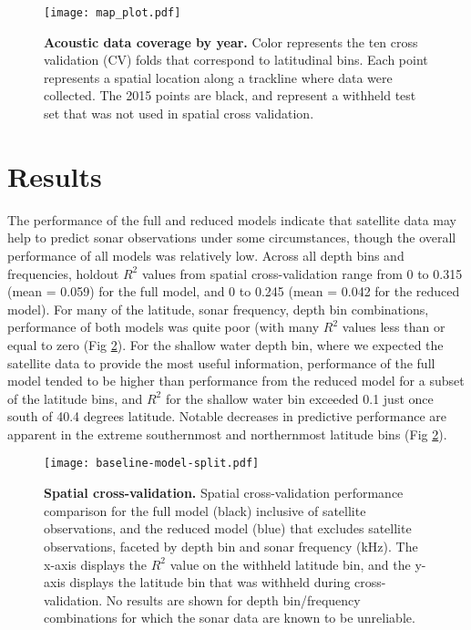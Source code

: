 \documentclass[10pt,letterpaper]{article}
\begin{document}
\begin{figure}[ht]
    \centering
    \texttt{[image: map\_plot.pdf]}
    \caption{{\bf Acoustic data coverage by year.} Color represents the ten cross validation (CV) folds that correspond to latitudinal bins. Each point represents a spatial location along a trackline where data were collected. The 2015 points are black, and represent a withheld test set that was not used in spatial cross validation.}
    \label{fig:fig1}
\end{figure}


\section*{Results}
The performance of the full and reduced models indicate that satellite data may help to predict sonar observations under some circumstances, though the overall performance of all models was relatively low. 
Across all depth bins and frequencies, holdout $R^2$ values from spatial cross-validation range from 0 to 0.315 (mean = 0.059) for the full model, and 0 to 0.245 (mean = 0.042 for the reduced model).
For many of the latitude, sonar frequency, depth bin combinations, performance of both models was quite poor (with many $R^2$ values less than or equal to zero (Fig \ref{fig:fig3}). 
For the shallow water depth bin, where we expected the satellite data to provide the most useful information, performance of the full model tended to be higher than performance from the reduced model for a subset of the latitude bins, and $R^2$ for the shallow water bin exceeded 0.1 just once south of 40.4 degrees latitude.
Notable decreases in predictive performance are apparent in the extreme southernmost and northernmost latitude bins (Fig \ref{fig:fig3}).

\begin{figure}[ht]
    \centering
    \texttt{[image: baseline-model-split.pdf]}
    \caption{{\bf Spatial cross-validation.} Spatial cross-validation performance comparison for the full model (black) inclusive of satellite observations, and the reduced model (blue) that excludes satellite observations, faceted by depth bin and sonar frequency (kHz). The x-axis displays the $R^2$ value on the withheld latitude bin, and the y-axis displays the latitude bin that was withheld during cross-validation. No results are shown for depth bin/frequency combinations for which the sonar data are known to be unreliable.}
    \label{fig:fig3}
\end{figure}
\end{document}
